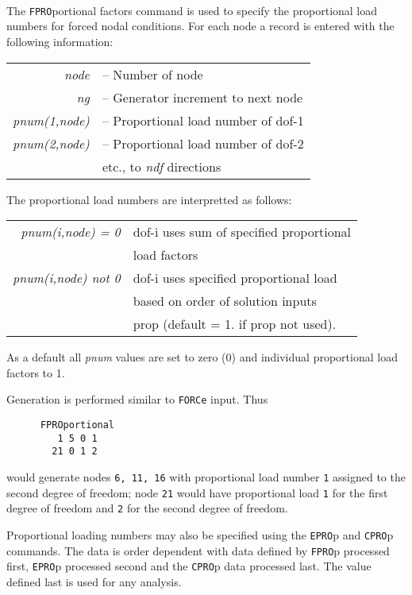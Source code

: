  \\{\smallskip}
 \\{\smallskip}
 \\{\smallskip}
\headb

The {\tt FPRO}portional factors command is used to specify the proportional
load numbers for forced nodal conditions.  For each node a
record is entered with the following information:

\begin{center}
\begin{tabular}{r l}
\it node         &-- Number of node \\
\it ng           &-- Generator increment to next node \\
\it pnum(1,node) &-- Proportional load number of dof-1 \\
\it pnum(2,node) &-- Proportional load number of dof-2 \\
                 &\quad etc., to {\it ndf} directions \\
\end{tabular}
\end{center}
The proportional load numbers are interpretted as follows:

\begin{center}
\begin{tabular}{r l}
\it pnum(i,node)  =  0  & dof-i uses sum of specified proportional \\
                        & load factors \\
\it pnum(i,node) not 0  & dof-i uses specified proportional load \\
                        & based on order of solution inputs \\
                        & prop (default = 1. if prop not used). \\
\end{tabular}
\end{center}
As a default all {\it pnum} values are set to zero (0) and individual
proportional load factors to 1.

Generation is performed similar to {\tt FORCe} input.  Thus
\begin{verbatim}
      FPROportional
         1 5 0 1
        21 0 1 2

\end{verbatim}
would generate nodes {\tt 6, 11, 16} with proportional load number {\tt 1}
assigned to the second degree of freedom; node {\tt 21} would have
proportional load {\tt 1} for the first degree of freedom and {\tt 2} for
the second degree of freedom.

Proportional loading numbers may also be specified using the {\tt EPRO}p
and {\tt CPRO}p commands.  The data is order dependent with data
defined by {\tt FPRO}p processed first, {\tt EPRO}p processed second and
the {\tt CPRO}p data processed last.  The value defined last is used for
any analysis.
\vfil\eject
